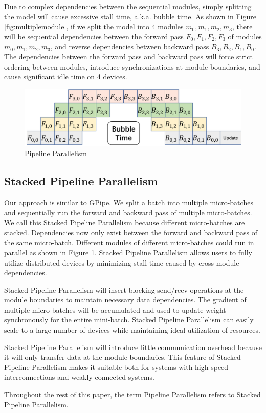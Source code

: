\documentclass[sigplan, nonacm]{acmart}\settopmatter{printfolios=true,printccs=false,printacmref=false}
\begin{document}
Due to complex dependencies between the sequential modules, simply splitting the model will cause excessive stall time, a.k.a. bubble time. As shown in Figure \ref{fig:multiplemodule}, if we split the model into 4 modules $m_0,m_1,m_2,m_3$, there will be sequential dependencies between the forward pass $F_0, F_1, F_2, F_3$ of modules $m_0,m_1,m_2,m_3$, and reverse dependencies between backward pass $B_3, B_2, B_1, B_0$. The dependencies between the forward pass and backward pass will force strict ordering between modules, introduce synchronizations at module boundaries, and cause significant idle time on 4 devices. \par
 \begin{figure}[htbp]
  \centering
  \includegraphics[scale=0.45]{stackedpipeline}
  \caption{Pipeline Parallelism}
  \label{fig:stackedpipeline}
\end{figure}
\subsection{Stacked Pipeline Parallelism}
Our approach is similar to GPipe\cite{huang2019gpipe}. We split a batch into multiple micro-batches and sequentially run the forward and backward pass of multiple micro-batches. We call this Stacked Pipeline Parallelism because different micro-batches are stacked. Dependencies now only exist between the forward and backward pass of the same micro-batch. Different modules of different micro-batches could run in parallel as shown in Figure \ref{fig:stackedpipeline}. Stacked Pipeline Parallelism allows users to fully utilize distributed devices by minimizing stall time caused by cross-module dependencies. \par
Stacked Pipeline Parallelism will insert blocking send/recv operations at the module boundaries to maintain necessary data dependencies. The gradient of multiple micro-batches will be accumulated and used to update weight synchronously for the entire mini-batch. Stacked Pipeline Parallelism can easily scale to a large number of devices while maintaining ideal utilization of resources.\par
Stacked Pipeline Parallelism will introduce little communication overhead because it will only transfer data at the module boundaries. This feature of Stacked Pipeline Parallelism makes it suitable both for systems with high-speed interconnections and weakly connected systems. \par
Throughout the rest of this paper, the term Pipeline Parallelism refers to Stacked Pipeline Parallelism.
\end{document}
